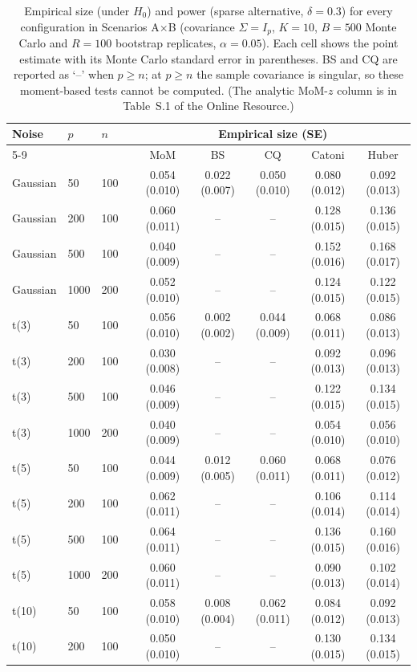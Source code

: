 \documentclass[pdflatex,sn-mathphys-num]{sn-jnl}
\theoremstyle{thmstyleone}%
\theoremstyle{thmstyletwo}%
\theoremstyle{thmstylethree}%
\begin{document}
\begin{table}[t]
\centering\small
\caption{Empirical size (under $H_0$) and power (sparse alternative, $\delta=0.3$) for every configuration in Scenarios A$\times$B (covariance $\Sigma=I_p$, $K=10$, $B=500$ Monte Carlo and $R=100$ bootstrap replicates, $\alpha=0.05$). Each cell shows the point estimate with its Monte Carlo standard error in parentheses. BS and CQ are reported as `--' when $p\ge n$; at $p\ge n$ the sample covariance is singular, so these moment-based tests cannot be computed. (The analytic MoM-$z$ column is in Table~S.1 of the Online Resource.)}
\label{tab:main}
\begin{tabular}{llllccccc}
\toprule
Noise & $p$ & $n$ & & \multicolumn{5}{c}{Empirical size (SE)} \\
\cmidrule{5-9}
 & & & & MoM & BS & CQ & Catoni & Huber \\
\midrule
Gaussian & 50 & 100 & & 0.054 (0.010) & 0.022 (0.007) & 0.050 (0.010) & 0.080 (0.012) & 0.092 (0.013) \\
Gaussian & 200 & 100 & & 0.060 (0.011) & -- & -- & 0.128 (0.015) & 0.136 (0.015) \\
Gaussian & 500 & 100 & & 0.040 (0.009) & -- & -- & 0.152 (0.016) & 0.168 (0.017) \\
Gaussian & 1000 & 200 & & 0.052 (0.010) & -- & -- & 0.124 (0.015) & 0.122 (0.015) \\
t(3) & 50 & 100 & & 0.056 (0.010) & 0.002 (0.002) & 0.044 (0.009) & 0.068 (0.011) & 0.086 (0.013) \\
t(3) & 200 & 100 & & 0.030 (0.008) & -- & -- & 0.092 (0.013) & 0.096 (0.013) \\
t(3) & 500 & 100 & & 0.046 (0.009) & -- & -- & 0.122 (0.015) & 0.134 (0.015) \\
t(3) & 1000 & 200 & & 0.040 (0.009) & -- & -- & 0.054 (0.010) & 0.056 (0.010) \\
t(5) & 50 & 100 & & 0.044 (0.009) & 0.012 (0.005) & 0.060 (0.011) & 0.068 (0.011) & 0.076 (0.012) \\
t(5) & 200 & 100 & & 0.062 (0.011) & -- & -- & 0.106 (0.014) & 0.114 (0.014) \\
t(5) & 500 & 100 & & 0.064 (0.011) & -- & -- & 0.136 (0.015) & 0.160 (0.016) \\
t(5) & 1000 & 200 & & 0.060 (0.011) & -- & -- & 0.090 (0.013) & 0.102 (0.014) \\
t(10) & 50 & 100 & & 0.058 (0.010) & 0.008 (0.004) & 0.062 (0.011) & 0.084 (0.012) & 0.092 (0.013) \\
t(10) & 200 & 100 & & 0.050 (0.010) & -- & -- & 0.130 (0.015) & 0.134 (0.015) \\

\end{tabular}
\end{table}
\end{document}
